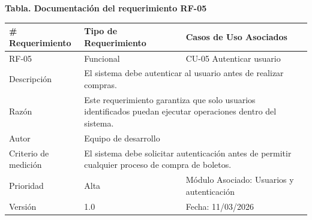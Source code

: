 \documentclass[12pt,letterpaper]{article}
\begin{document}
\noindent
\begin{minipage}{\textwidth}
\centering
\scriptsize
\renewcommand{\arraystretch}{0.9}
\setlength{\tabcolsep}{3pt}
\setlength{\arrayrulewidth}{0.5pt}

\textbf{Tabla. Documentación del requerimiento RF-05}

\vspace{2pt}

\begin{tabularx}{\textwidth}{|p{2.6cm}|X|p{3.4cm}|}
\hline
\# Requerimiento & Tipo de Requerimiento & Casos de Uso Asociados \\ \hline
RF-05 & Funcional & CU-05 Autenticar usuario \\ \hline
Descripción & \multicolumn{2}{X|}{El sistema debe autenticar al usuario antes de realizar compras.} \\ \hline
Razón & \multicolumn{2}{X|}{Este requerimiento garantiza que solo usuarios identificados puedan ejecutar operaciones dentro del sistema.} \\ \hline
Autor & \multicolumn{2}{X|}{Equipo de desarrollo} \\ \hline
Criterio de medición & \multicolumn{2}{X|}{El sistema debe solicitar autenticación antes de permitir cualquier proceso de compra de boletos.} \\ \hline
Prioridad & Alta & Módulo Asociado: Usuarios y autenticación \\ \hline
Versión & 1.0 & Fecha: 11/03/2026 \\ \hline
\end{tabularx}
\end{minipage}

\vspace{0.2cm}
\end{document}
